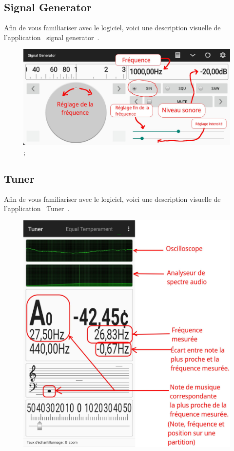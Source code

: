 \documentclass[12pt,a4paper,notitlepage]{article}
\begin{document}
\subsection*{Signal Generator}
Afin de vous familiariser avec le logiciel, voici une description visuelle de l'application \og~signal generator~\fg{}.
\begin{figure}
	\centering
	\includegraphics{signal-generator-1kHz.jpg} ;
\end{figure}

\subsection*{Tuner}
Afin de vous familiariser avec le logiciel, voici une description visuelle de l'application \og~Tuner~\fg{}.\begin{figure}
	\centering
	\includegraphics{Tuner.jpg}
\end{figure}
\end{document}
